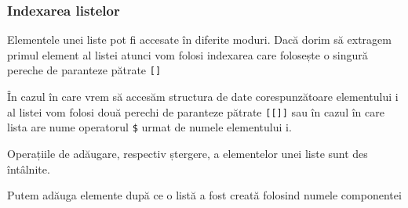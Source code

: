 \documentclass[]{article}
\newenvironment{Shaded}{\begin{snugshade}}{\end{snugshade}}
\newcommand{\KeywordTok}[1]{\textcolor[rgb]{0.13,0.29,0.53}{\textbf{#1}}}
\newcommand{\DecValTok}[1]{\textcolor[rgb]{0.00,0.00,0.81}{#1}}
\newcommand{\StringTok}[1]{\textcolor[rgb]{0.31,0.60,0.02}{#1}}
\newcommand{\CommentTok}[1]{\textcolor[rgb]{0.56,0.35,0.01}{\textit{#1}}}
\newcommand{\OperatorTok}[1]{\textcolor[rgb]{0.81,0.36,0.00}{\textbf{#1}}}
\newcommand{\NormalTok}[1]{#1}
\begin{document}
\subsubsection{Indexarea listelor}\label{indexarea-listelor}

Elementele unei liste pot fi accesate în diferite moduri. Dacă dorim să
extragem primul element al listei atunci vom folosi indexarea care
folosește o singură pereche de paranteze pătrate \texttt{{[}{]}}

\begin{Shaded}
\end{Shaded}

În cazul în care vrem să accesăm structura de date corespunzătoare
elementului i al listei vom folosi două perechi de paranteze pătrate
\texttt{{[}{[}{]}{]}} sau în cazul în care lista are nume operatorul
\texttt{\$} urmat de numele elementului i.

\begin{Shaded}
\end{Shaded}

Operațiile de adăugare, respectiv ștergere, a elementelor unei liste
sunt des întâlnite.

Putem adăuga elemente după ce o listă a fost creată folosind numele
componentei
\end{document}
